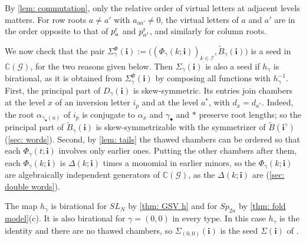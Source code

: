 \documentclass[a4paper]{amsart}
\numberwithin{equation}{section}
\theoremstyle{definition}
\theoremstyle{remark}
\newcommand{\bbC}{\mathbb{C}}
\newcommand{\mcG}{\mathcal{G}}
\newcommand{\mcI}{\mathcal{I}}
\newcommand{\bfi}{\mathbf{i}}
\newcommand{\tB}{\widetilde{B}}
\newcommand{\rr}{{\rm r}}
\newcommand{\Sp}{Sp_{2n}}
\begin{document}
By \cref{lem: commutation}, only the relative order of virtual letters at adjacent levels matters.
For row roots $a\neq a'$ with $a_{aa'}\neq0$, the virtual letters of $a$ and $a'$ are in the order opposite to that of $p^\rr_a$ and $p^\rr_{a'}$, and similarly for column roots.

We now check that the pair $\Sigma^\Phi_\gamma(\bfi):=\big((\Phi_\gamma(k;\bfi))_{k\in\mcI},\tB_\gamma(\bfi)\big)$ is a seed in $\bbC(\mcG)$, for the two reasons given below. Then $\Sigma_\gamma(\bfi)$ is also a seed if $h_\gamma$ is birational, as it is obtained from $\Sigma^\Phi_\gamma(\bfi)$ by composing all functions with $h_\gamma^{-1}$.
First, the principal part of $D_\gamma(\bfi)$ is skew-symmetric.
Its entries join chambers at the level $x$ of an inversion letter $i_p$ and at the level $a^*$, with $d_x=d_{a^*}$.
Indeed, the root $\alpha_{\gamma_\bullet(a)}$ of $i_p$ is conjugate to $\alpha_x$ and $\gamma_\bullet$ and $*$ preserve root lengths; so the principal part of $\tB_\gamma(\bfi)$ is skew-symmetrizable with the symmetrizer of $\tB(\bfi^\gamma)$ (\cref{sec: words}).
Second, by \cref{lem: tails} the thawed chambers can be ordered so that each $\Phi_\gamma(t;\bfi)$ involves only earlier ones. Putting the other chambers after them, each $\Phi_\gamma(k;\bfi)$ is $\Delta(k;\bfi)$ times a monomial in earlier minors, so the $\Phi_\gamma(k;\bfi)$ are algebraically independent generators of $\bbC(\mcG)$, as the $\Delta(k;\bfi)$ are (\cref{sec: double words}).

The map $h_\gamma$ is birational for $SL_N$ by \cref{thm: GSV h} and for $\Sp$ by \cref{thm: fold model}(c).
It is also birational for $\gamma=(0,0)$ in every type.
In this case $h_\gamma$ is the identity and there are no thawed chambers, so $\Sigma_{(0,0)}(\bfi)$ is the seed $\Sigma(\bfi)$ of \cite[Theorem~2.10]{BFZ05}.
\end{document}
